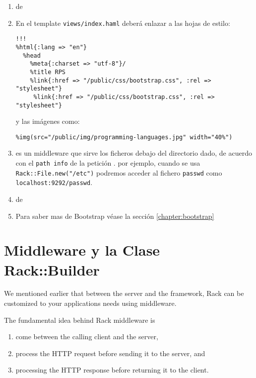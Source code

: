 \begin{enumerate}
\item 
{}
de 
\rackstatic{} 
\item 
En el template \verb|views/index.haml| deberá enlazar a las hojas de estilo:
\begin{verbatim}
!!!
%html{:lang => "en"}
  %head
    %meta{:charset => "utf-8"}/
    %title RPS 
    %link{:href => "/public/css/bootstrap.css", :rel => "stylesheet"}
     %link{:href => "/public/css/bootstrap.css", :rel => "stylesheet"}
\end{verbatim}
y las imágenes como:
\begin{verbatim}
%img(src="/public/img/programming-languages.jpg" width="40%")
\end{verbatim}
\item 
\rackfile{} es un middleware que sirve los ficheros debajo del directorio
dado, de acuerdo con el \verb|path info| de la petición \Rack{}.
por ejemplo, cuando  se usa
\verb|Rack::File.new("/etc")|
podremos acceder al fichero \verb'passwd' como
\verb|localhost:9292/passwd|.
\item 
{}
de \rackfile{}
\item 
Para saber mas de Bootstrap véase la sección
\ref{chapter:bootstrap}
\end{enumerate}

\section{Middleware y la Clase Rack::Builder}
\label{section:middleware}

We mentioned earlier that between the server and the framework, Rack
can be customized to your applications needs using middleware. 

The
fundamental idea behind Rack middleware is
\begin{enumerate}
\item 
come between the
calling client and the server, 
\item 
process the HTTP request before sending
it to the server, and 
\item 
processing the HTTP response before returning it
to the client.
\end{enumerate}


